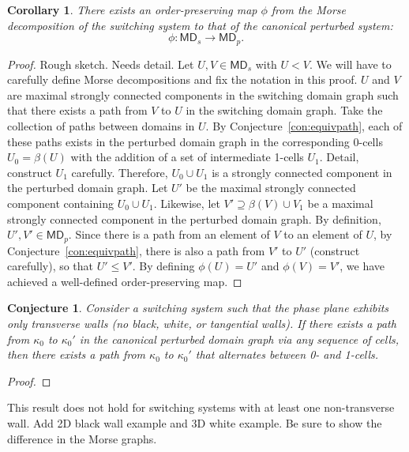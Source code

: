 \documentclass[12pt]{article}
\newtheorem{cor}{Corollary}[section]
\newtheorem{con}{Conjecture}[section]
\theoremstyle{definition}
\theoremstyle{remark}
\begin{document}
\begin{cor}\label{cor:ordpreserv}
	There exists an order-preserving map $\phi$ from the Morse decomposition of the switching system to that of the canonical perturbed system: 
	\[ \phi: \mathsf{MD}_s \to \mathsf{MD}_p. \]
\end{cor}
\begin{proof}
	{\color{red} Rough sketch. Needs detail.}
	Let $U,V \in \mathsf{MD}_s$ with $U < V$. {\color{red} We will have to carefully define Morse decompositions and fix the notation in this proof.} $U$ and $V$ are maximal strongly connected components in the switching domain graph such that there exists a path from $V$ to $U$ in the switching domain graph. Take the collection of paths between domains in $U$. By Conjecture~\ref{con:equivpath}, each of these paths exists in the perturbed domain graph in the corresponding 0-cells $U_0 = \beta(U)$ with the addition of a set of intermediate 1-cells $U_1$. {\color{red} Detail, construct $U_1$ carefully.} Therefore, $ U_0 \cup U_1$ is a strongly connected component in the perturbed domain graph.  Let $U'$ be the maximal strongly connected component containing $U_0 \cup U_1$. Likewise, let $V' \supseteq \beta(V) \cup V_1$ be a maximal strongly connected component in the perturbed domain graph. By definition, $U',V' \in \mathsf{MD}_p$. Since there is a path from an element of $V$ to an element of $U$, by Conjecture~\ref{con:equivpath}, there is also a path from $V'$ to $U'$ {\color{red} (construct carefully)}, so that $U' \leq V'$. By defining $\phi(U) = U'$ and $\phi(V) = V'$, we have achieved a well-defined order-preserving map. 
\end{proof}

\begin{con}\label{con:transverse}
	Consider a switching system such that the phase plane exhibits only transverse walls (no black, white, or tangential walls). If there exists a path from $\kappa_0$ to $\kappa_0'$ in the canonical perturbed domain graph via any sequence of cells, then there exists a path from $\kappa_0$ to $\kappa_0'$ that alternates between 0- and 1-cells.
\end{con}
\begin{proof}
\end{proof}

\vspace{12pt}


This result does not hold for switching systems with at least one non-transverse wall. {\color{red} Add 2D black wall example and 3D white example. Be sure to show the difference in the Morse graphs.}
\end{document}
